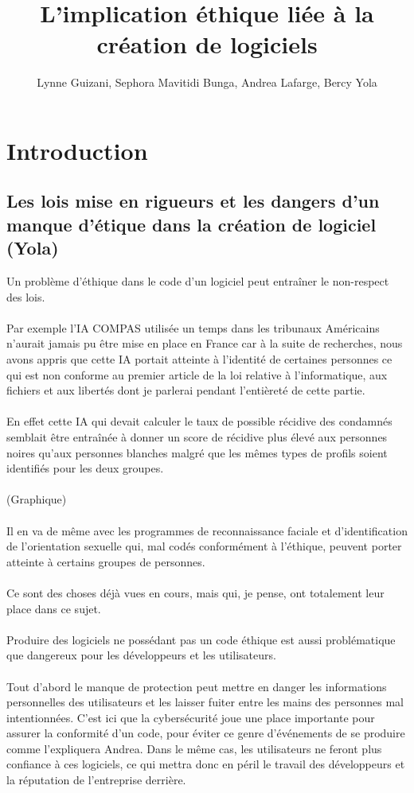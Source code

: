 \documentclass{article}
\title{L'implication éthique liée à la création de logiciels}
\author{Lynne Guizani, Sephora Mavitidi Bunga, Andrea Lafarge, Bercy Yola}
\begin{document}
\maketitle

\section{Introduction}

\subsection{Les lois mise en rigueurs et les dangers d'un manque d'étique dans la création de logiciel (Yola)}

Un problème d'éthique dans le code d'un logiciel peut entraîner le non-respect des lois.\\
\\Par exemple l'IA COMPAS utilisée un temps dans les tribunaux Américains n'aurait jamais pu être mise en place en France car à la suite de recherches, nous avons appris que cette IA portait atteinte à l'identité de certaines personnes ce qui est non conforme au premier article de la loi relative à l'informatique, aux fichiers et aux libertés dont je parlerai pendant l'entièreté de cette partie.\\
\\En effet cette IA qui devait calculer le taux de possible récidive des condamnés semblait être entraînée à donner un score de récidive plus élevé aux personnes noires qu’aux personnes blanches malgré que les mêmes types de profils soient identifiés pour les deux groupes.\\
\\
(Graphique)
\\
\\Il en va de même avec les programmes de reconnaissance faciale et d'identification de l'orientation sexuelle qui, mal codés conformément à l'éthique, peuvent porter atteinte à certains groupes de personnes.\\
\\Ce sont des choses déjà vues en cours, mais qui, je pense, ont totalement leur place dans ce sujet.\\
\\Produire des logiciels ne possédant pas un code éthique est aussi problématique que dangereux pour les développeurs et les utilisateurs.\\
\\Tout d'abord le manque de protection peut mettre en danger les informations personnelles des utilisateurs et les laisser fuiter entre les mains des personnes mal intentionnées. C'est ici que la cybersécurité joue une place importante pour assurer la conformité d'un code, pour éviter ce genre d'événements de se produire comme l'expliquera Andrea. Dans le même cas, les utilisateurs ne feront plus confiance à ces logiciels, ce qui mettra donc en péril le travail des développeurs et la réputation de l'entreprise derrière.\\
\end{document}
